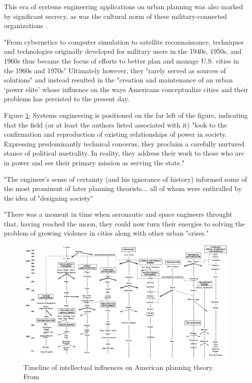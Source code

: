 This era of systems engineering applications on urban planning was also marked by significant secrecy, as was the cultural norm of these military-connected organizations \cite{lightWarfareWelfareDefense2005}.

"From cybernetics to computer simulation to satellite reconnaissance, techniques and technologies originally developed for military users in the 1940s, 1950s, and 1960s thus became the focus of efforts to better plan and manage U.S. cities in the 1960s and 1970s" Ultimately however, they "rarely served as sources of solutions" and instead resulted in the "creation and maintenance of an urban `power elite' whose influence on the ways Americans conceptualize cities and their problems has persisted to the present day. \cite{lightWarfareWelfareDefense2005}

Figure \ref{fig:friedman_timeline}; Systems engineering is positioned on the far left of the figure, indicating that the field (or at least the authors listed associated with it) "look to the confirmation and reproduction of existing relationships of power in society. Expressing predominantly technical concerns, they proclaim a carefully nurtured stance of political nuetrality. In reality, they address their work to those who are in power and see their primary mission as serving the state." \cite{mazza2017}

"The engineer's sense of certainty (and his ignorance of history) informed some of the most prominent of later planning theorists... all of whom were enthralled by the idea of "designing society" \cite{mazza2017}

"There was a moment in time when aeronautic and space engineers throught that, having reached the moon, they could now turn their energies to solving the problem of growing violence in cities along with other urban "crises." \cite{mazza2017}

\clearpage
\begin{figure}
	\centering
	\includegraphics[scale=0.65]{Figures/chap2/friedman_timeline.png}
	\caption[Timeline of intellectual influences on American planning theory]{Timeline of intellectual influences on American planning theory. From \cite{mazza2017}}
	\label{fig:friedman_timeline}
\end{figure}
\clearpage

